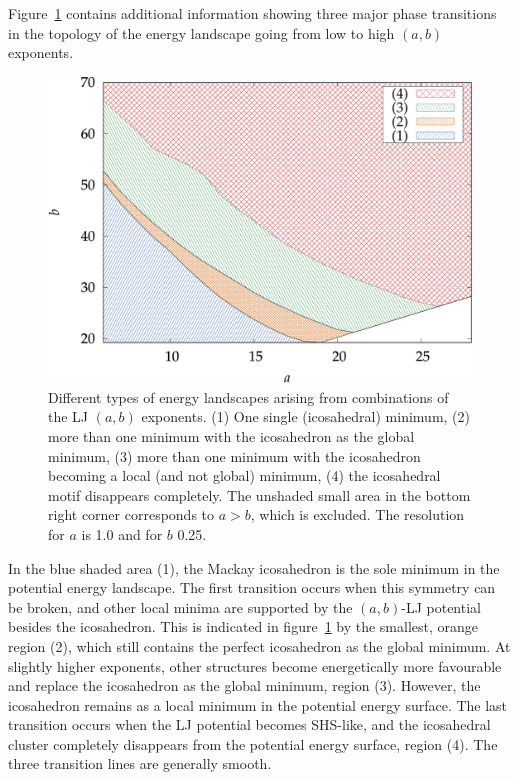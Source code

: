 Figure~\ref{fig:no-ico} contains additional information showing three major
phase transitions in the topology of the energy landscape going from low to high
$(a,b)$ exponents. 
%
\begin{figure}[htb]\centering
    \includegraphics[width=.8\columnwidth]{gregory-newton/no-ico.pdf}
    \caption{Different types of energy landscapes arising from combinations of
    the LJ $(a,b)$ exponents. (1) One single (icosahedral) minimum, (2) more
    than one minimum with the icosahedron as the global minimum, (3) more than
    one minimum with the icosahedron becoming a local (and not global) minimum,
    (4) the icosahedral motif disappears completely. The unshaded small area
    in the bottom right corner corresponds to $a>b$, which is excluded. The
    resolution for $a$ is 1.0 and for $b$ 0.25.}
    \label{fig:no-ico}
\end{figure}
%
In the blue shaded area (1), the Mackay icosahedron is the sole minimum in the
potential energy landscape. The first transition occurs when this symmetry can
be broken, and other local minima are supported by the $(a,b)$-\ac{LJ} potential
besides the icosahedron. This is indicated in figure~\ref{fig:no-ico} by the
smallest, orange region (2), which still contains the perfect icosahedron as the
global minimum. At slightly higher exponents, other structures become
energetically more favourable and replace the icosahedron as the global minimum,
region (3). However, the icosahedron remains as a local minimum in the potential
energy surface. The last transition occurs when the \ac{LJ} potential becomes
\ac{SHS}-like, and the icosahedral cluster completely disappears from the
potential energy surface, region (4). The three transition lines are generally
smooth.

